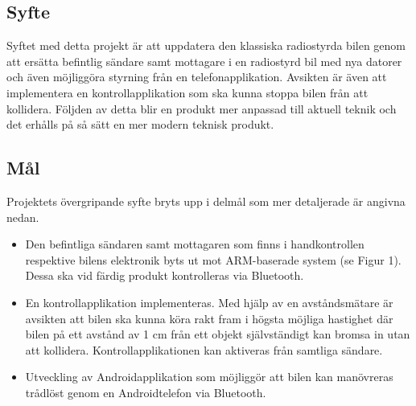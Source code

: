 \documentclass[a4paper]{article}
\begin{document}
\subsection{Syfte}

Syftet med detta projekt är att uppdatera den klassiska radiostyrda bilen genom att ersätta befintlig sändare samt mottagare i en radiostyrd bil med nya datorer och även möjliggöra styrning från en telefonapplikation. Avsikten är även att implementera en kontrollapplikation som ska kunna stoppa bilen från att kollidera. Följden av detta blir en produkt mer anpassad till aktuell teknik och det erhålls på så sätt en mer modern teknisk produkt.



\subsection{Mål}
Projektets övergripande syfte bryts upp i delmål som mer detaljerade är angivna nedan.

\begin{itemize}
\item Den befintliga sändaren samt mottagaren som finns i handkontrollen respektive bilens elektronik byts ut mot ARM-baserade system (se Figur 1). Dessa ska vid färdig produkt kontrolleras via Bluetooth.
\item En kontrollapplikation implementeras. Med hjälp av en avståndsmätare är avsikten att bilen ska kunna köra rakt fram i högsta möjliga hastighet där bilen på ett avstånd av 1 cm från ett objekt självständigt kan bromsa in utan att kollidera. Kontrollapplikationen kan aktiveras från samtliga sändare.
\item Utveckling av Androidapplikation som möjliggör att bilen kan manövreras trådlöst genom en Androidtelefon via Bluetooth.
\end{itemize}
\end{document}
